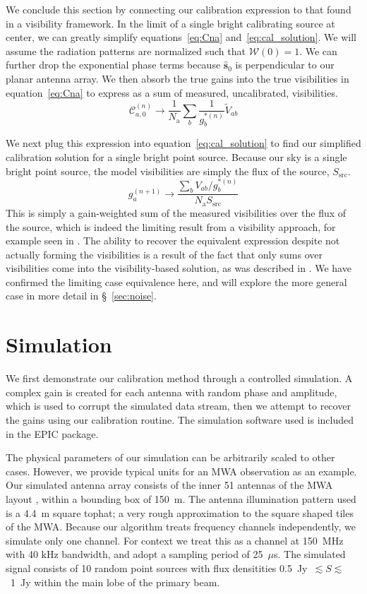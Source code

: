 \documentclass[a4paper,fleqn,usenatbib]{mnras}
\newcommand{\Nant}{\ensuremath{N_{\mathrm{a}}}}
\newcommand{\spix}{\ensuremath{\hat{\mathbf{s}}_{0}}}
\newcommand{\V}{\ensuremath{\widetilde{V}}}
\begin{document}
We conclude this section by connecting our calibration expression to that found in a visibility 
framework. In the limit of a single bright calibrating source at center, we can greatly 
simplify equations~\ref{eq:Cna} and~\ref{eq:cal_solution}. We will assume the radiation patterns are 
normalized such that $\mathcal{W}(0)=1$. We can further drop the exponential phase terms 
because $\spix$ is perpendicular to our planar antenna array. We then absorb the true gains into the true visibilities in 
equation~\ref{eq:Cna} to express as a sum of measured, uncalibrated, visibilities.
\begin{equation}
\mathcal{C}^{(n)}_{a,0} \rightarrow \frac{1}{\Nant}\sum_b \frac{1}{g^{*(n)}_b} \V_{ab}
\end{equation}

We next plug this expression into equation~\ref{eq:cal_solution} to find our simplified 
calibration solution for a single bright point source. Because our sky is a single bright point 
source, the model visibilities are simply the flux of the source, $S_{\mathrm{src}}$.
\begin{equation}
g^{(n+1)}_a \rightarrow \frac{\sum_b  V_{ab}/g^{*(n)}_b}{\Nant S_{\mathrm{src}}}
\end{equation}
This is simply a gain-weighted sum of the measured visibilities over the flux of the source, 
which is indeed the limiting result from a visibility approach, for example seen in \citealt{mit08}. 
The ability to recover the equivalent expression despite not actually forming the visibilities is a 
result of the fact that only sums over visibilities come into the visibility-based solution, as was described in 
\citealt{mor11}. We have confirmed the limiting case equivalence here, and will explore the 
more general case in more detail in \S~\ref{sec:noise}.

\section{Simulation}\label{sec:sim}
We first demonstrate our calibration method through a controlled simulation. A complex gain is 
created for each antenna with random phase and amplitude, which is used to corrupt the 
simulated data stream, then we attempt to recover the gains using our calibration routine. The 
simulation software used is included in the EPIC package.

The physical parameters of our simulation can be arbitrarily scaled to other cases. However, 
we provide typical units for an MWA observation as an example. Our simulated antenna 
array consists of the inner 51 antennas of the MWA layout \citep{bea12}, within a bounding 
box of 150~m. The antenna illumination pattern used is a 4.4~m square tophat; a very rough 
approximation to the square shaped tiles of the MWA. Because our algorithm treats frequency 
channels independently, we simulate only one channel. For context we treat this as a channel
at 150~MHz with 40 kHz bandwidth, and adopt a sampling period of 25~$\mu$s. The simulated signal 
consists of 10 random point sources with flux densitities 0.5~Jy~$\lesssim S \lesssim$~1~Jy 
within the main lobe of the primary beam.
\end{document}
